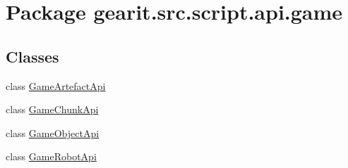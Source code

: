 \hypertarget{namespacegearit_1_1src_1_1script_1_1api_1_1game}{\section{Package gearit.\+src.\+script.\+api.\+game}
\label{namespacegearit_1_1src_1_1script_1_1api_1_1game}
}
\subsection*{Classes}
\begin{DoxyCompactItemize}
\item 
class \hyperlink{classgearit_1_1src_1_1script_1_1api_1_1game_1_1_game_artefact_api}{Game\+Artefact\+Api}
\item 
class \hyperlink{classgearit_1_1src_1_1script_1_1api_1_1game_1_1_game_chunk_api}{Game\+Chunk\+Api}
\item 
class \hyperlink{classgearit_1_1src_1_1script_1_1api_1_1game_1_1_game_object_api}{Game\+Object\+Api}
\item 
class \hyperlink{classgearit_1_1src_1_1script_1_1api_1_1game_1_1_game_robot_api}{Game\+Robot\+Api}
\end{DoxyCompactItemize}
